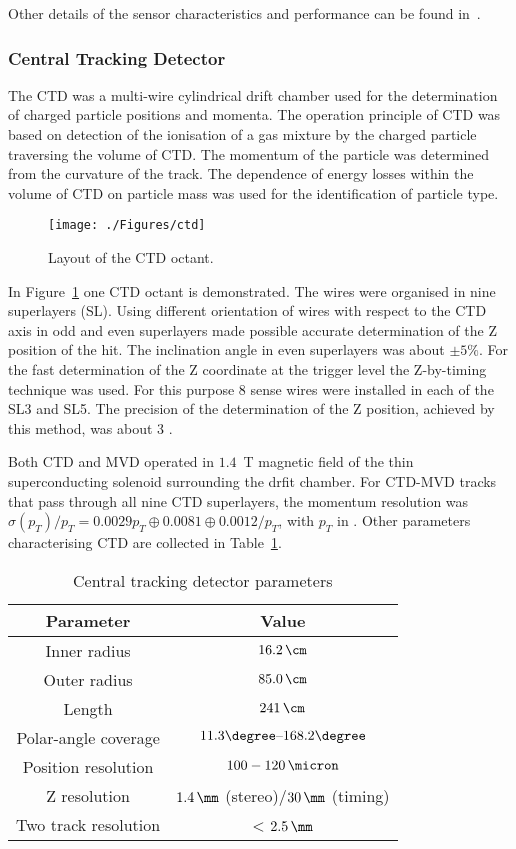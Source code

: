 Other details of the sensor characteristics and performance can be found in~\cite{tech:mvd:prc9701}.

\subsubsection{Central Tracking Detector}
\label{subsubsec:ctd}
The CTD was a multi-wire cylindrical drift chamber used for the determination of charged particle positions and momenta. The operation principle of CTD was based on detection of the ionisation of a gas mixture by the charged particle traversing the volume of CTD. The momentum of the particle was determined from the curvature of the track. The dependence of energy losses within the volume of CTD on particle mass was used for the identification of particle type.
\begin{figure}[htpb]
	\centering
		\texttt{[image: ./Figures/ctd]}
	\caption{Layout of the CTD octant.}
	\label{fig:ctd}
\end{figure}
In Figure~\ref{fig:ctd} one CTD octant is demonstrated. The wires were organised in nine superlayers (SL). Using different orientation of wires with respect to the CTD axis in odd and even superlayers made possible accurate determination of the Z position of the hit. The inclination angle in even superlayers was about $\pm 5\%$. For the fast determination of the Z coordinate at the trigger level the Z-by-timing technique was used. For this purpose 8 sense wires were installed in each of the SL3 and SL5. The precision of the determination of the Z position, achieved by this method, was about 3 \cm.

Both CTD and MVD operated in $1.4$~T magnetic field of the thin superconducting solenoid surrounding the drfit chamber. For CTD-MVD tracks that pass through all nine CTD superlayers, the momentum resolution was $\sigma(p_{T})/p_{T} = 0.0029 p_{T} \oplus 0.0081 \oplus
0.0012/p_{T}$, with $p_{T}$ in \GeV. Other parameters characterising CTD are collected in Table~\ref{tab:ctdgeomparameters}.

\begin{table}[htbp]
\begin{tabular}{ | c | c | }
     \hline
      Parameter & Value \\
			\hline
			\hline
			Inner radius & $16.2\,\cm$ \\ \hline
      Outer radius & $85.0\,\cm$  \\ \hline
			Length & $241\,\cm$ \\ \hline 
			Polar-angle coverage & $11.3\degree \mbox{--} 168.2\degree$ \\ \hline
			Position resolution & $100-120\,\micron$ \\ \hline
			Z resolution & $1.4\,\mm$ (stereo)/$30\,\mm$ (timing) \\ \hline
			Two track resolution & < $2.5\,\mm$ \\
      \hline
     \end{tabular}
	\caption{Central tracking detector parameters}
	\label{tab:ctdgeomparameters}
\end{table}
